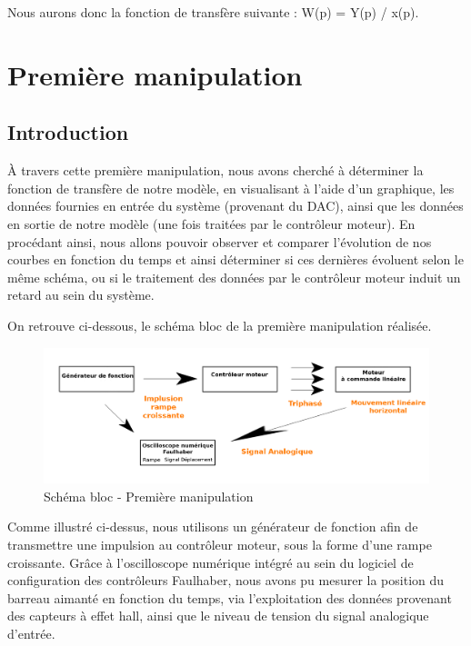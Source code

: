 \documentclass[french,a4paper,12pt]{report}
\begin{document}
	Nous aurons donc la fonction de transfère suivante : W(p) = Y(p) / x(p).
	
	\newpage
	
	\chapter{Première manipulation}
	
		\section{Introduction}
	
		À travers cette première manipulation, nous avons cherché à déterminer la fonction de transfère de notre modèle, en visualisant à l'aide d'un graphique, les données fournies en entrée du système (provenant du DAC), ainsi que les données en sortie de notre modèle (une fois traitées par le contrôleur moteur).
		En procédant ainsi, nous allons pouvoir observer et comparer l'évolution de nos courbes en fonction du temps et ainsi déterminer si ces dernières évoluent selon le même schéma, ou si le traitement des données par le contrôleur moteur induit un retard au sein du système.
		
	On retrouve ci-dessous, le schéma bloc de la première manipulation réalisée.
		
	\begin{figure}[!ht]
    \center
  	\includegraphics[width=18cm]{manip1.png}
    \caption{Schéma bloc - Première manipulation}
	\end{figure}	
		
		Comme illustré ci-dessus, nous utilisons un générateur de fonction afin de transmettre une impulsion au contrôleur moteur, sous la forme d'une rampe croissante.
		Grâce à l'oscilloscope numérique intégré au sein du logiciel de configuration des contrôleurs Faulhaber, nous avons pu mesurer la position du barreau aimanté en fonction du temps, via l'exploitation des données provenant des capteurs à effet hall, ainsi que le niveau de tension du signal analogique d'entrée.
		
\end{document}
